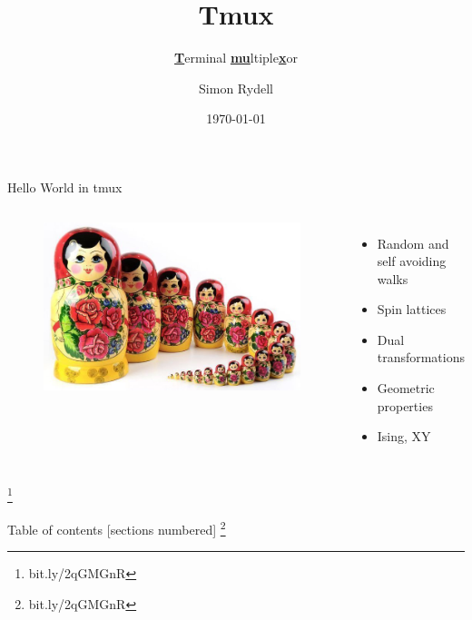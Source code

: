 \documentclass[10pt]{beamer}
\title{Tmux}
\subtitle{\underline{\textbf{T}}erminal \underline{\textbf{mu}}ltiple\underline{\textbf{x}}or}
\date{\today}
\date{}
\author{Simon Rydell}
\institute{Systecon}
\newcommand\blfootnote[1]{%
  \begingroup
  \renewcommand\thefootnote{}\footnote{#1}%
  \addtocounter{footnote}{-1}%
  \endgroup
}
\begin{document}
\begin{frame}
\titlepage
\end{frame}

% 
\begin{frame}{Hello World in tmux}
    \begin{columns}[c]
        \column{3in}
        \begin{figure}[h!]
            \centering
            \includegraphics[width=1\textwidth]{../figures/russianDoll.jpeg}
        \end{figure}
        \column{1.5in}
        \begin{itemize}
            \item Random and self avoiding walks
            \item Spin lattices
            \item Dual transformations
            \item Geometric properties
            \item Ising, XY
        \end{itemize}
    \end{columns}
    \blfootnote{bit.ly/2qGMGnR}
\end{frame}

% 
\begin{frame}{Table of contents}
    [sections numbered]
    \tableofcontents[hideallsubsections]
    \blfootnote{bit.ly/2qGMGnR}
\end{frame}


\end{document}
